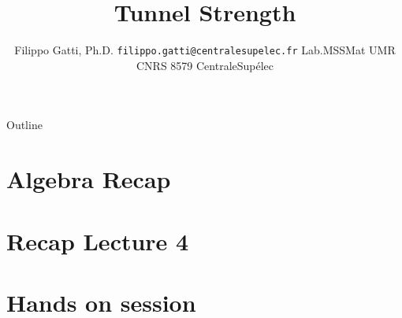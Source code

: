 \documentclass[usenames,dvipsnames]{beamer}
\title[CentraleSupélec]{Tunnel Strength}
\author[Filippo Gatti]{
  Filippo Gatti, Ph.D.
  \pdfnewline
  \texttt{filippo.gatti@centralesupelec.fr}
  \pdfnewline  Lab.MSSMat UMR CNRS 8579
  \pdfnewline CentraleSupélec
}
\institute{Continuum Mechanics}
\newcommand{\writeup}{.}
\newcommand{\presentations}{\writeup}
\newcommand{\runfolder}{\presentations}
\newcommand{\runsections}{\runfolder/sections}
\begin{document}
\begin{frame}
\titlepage
\end{frame}

\begin{frame}{Outline}
\tableofcontents
\end{frame}

\section{Algebra Recap}


\section{Recap Lecture 4}


\section{Hands on session}



%
%
%
%
%
%
%
\end{document}
